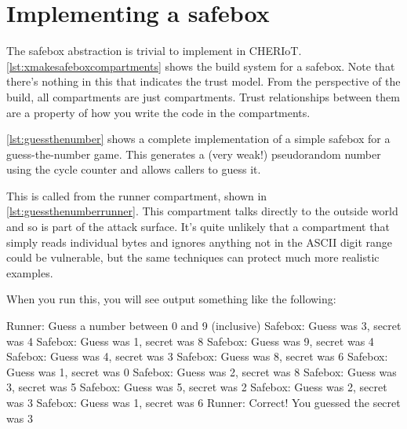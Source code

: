 \section{Implementing a safebox}

The safebox abstraction is trivial to implement in CHERIoT.
\ref{lst:xmakesafeboxcompartments} shows the build system for a safebox.
Note that there's nothing in this that indicates the trust model.
From the perspective of the build, all compartments are just compartments.
Trust relationships between them are a property of how you write the code in the compartments.

\lualisting[filename=examples/safebox/xmake.lua,marker=firmware,label=lst:xmakesafeboxcompartments,caption="Build system code for the safebox example."]{}

\ref{lst:guessthenumber} shows a complete implementation of a simple safebox for a guess-the-number game.
This generates a (very weak!) pseudorandom number using the cycle counter and allows callers to guess it.

\codelisting[marker=safebox,caption=A safebox for a guess-the-numbers game,label=lst:guessthenumber, filename=examples/safebox/safebox.cc]{}

This is called from the runner compartment, shown in \ref{lst:guessthenumberrunner}.
This compartment talks directly to the outside world and so is part of the attack surface.
It's quite unlikely that a compartment that simply reads individual bytes and ignores anything not in the ASCII digit range could be vulnerable, but the same techniques can protect much more realistic examples.

\codelisting[marker=runner,caption=The runner compartment for the guess-the-numbers game,label=lst:guessthenumberrunner, filename=examples/safebox/runner.cc]{}

When you run this, you will see output something like the following:

\begin{console}
Runner: Guess a number between 0 and 9 (inclusive)
Safebox: Guess was 3, secret was 4
Safebox: Guess was 1, secret was 8
Safebox: Guess was 9, secret was 4
Safebox: Guess was 4, secret was 3
Safebox: Guess was 8, secret was 6
Safebox: Guess was 1, secret was 0
Safebox: Guess was 2, secret was 8
Safebox: Guess was 3, secret was 5
Safebox: Guess was 5, secret was 2
Safebox: Guess was 2, secret was 3
Safebox: Guess was 1, secret was 6
Runner: Correct!  You guessed the secret was 3
\end{console}

